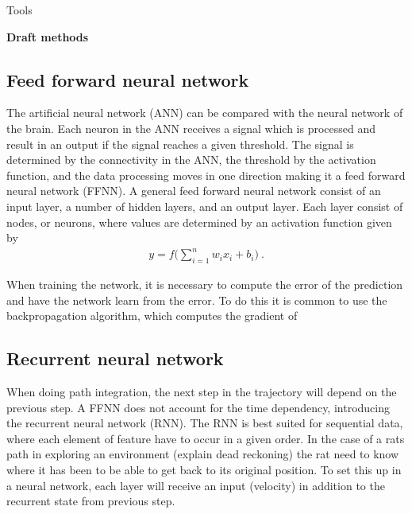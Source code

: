 Tools

\textbf{Draft methods}
\subsection{Feed forward neural network}\label{sssec:ffnn}
The artificial neural network (ANN) can be compared with the neural network of the brain. Each neuron in the ANN receives a signal which is processed and result in an output if the signal reaches a given threshold. The signal is determined by the connectivity in the ANN, the threshold by the activation function, and the data processing moves in one direction making it a feed forward neural network (FFNN).
A general feed forward neural network consist of an input layer, a number of hidden layers, and an output layer. Each layer consist of nodes, or neurons, where values are determined by an activation function given by 
\begin{align}
    y = f \bigg( \sum_{i=1}^{n} w_{i} x_{i} + b_{i} \bigg) \ .
\end{align}

When training the network, it is necessary to compute the error of the prediction and have the network learn from the error. To do this it is common to use the backpropagation algorithm, which computes the gradient of 

\subsection{Recurrent neural network}\label{sssec:rnn}
When doing path integration, the next step in the trajectory will depend on the previous step. A FFNN does not account for the time dependency, introducing the recurrent neural network (RNN). The RNN is best suited for sequential data, where each element of feature have to occur in a given order. In the case of a rats path in exploring an environment (explain dead reckoning) the rat need to know where it has been to be able to get back to its original position. To set this up in a neural network, each layer will receive an input (velocity) in addition to the recurrent state from previous step.


